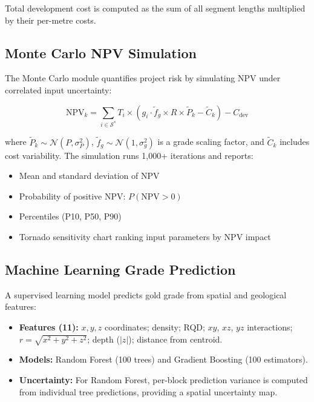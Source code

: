 \documentclass[12pt,a4paper]{article}
\begin{document}
Total development cost is computed as the sum of all segment lengths multiplied by their per-metre costs.

\subsection{Monte Carlo NPV Simulation}
\label{sec:monte-carlo}

The Monte Carlo module quantifies project risk by simulating NPV under correlated input uncertainty:

\begin{equation}
    \text{NPV}_k = \sum_{i \in \mathcal{S}^*} T_i \times \left( g_i \cdot \tilde{f}_g \times R \times \tilde{P}_k - \tilde{C}_k \right) - C_{\text{dev}}
\end{equation}

where $\tilde{P}_k \sim \mathcal{N}(P, \sigma_P^2)$, $\tilde{f}_g \sim \mathcal{N}(1, \sigma_g^2)$ is a grade scaling factor, and $\tilde{C}_k$ includes cost variability. The simulation runs 1{,}000+ iterations and reports:

\begin{itemize}[itemsep=0.1em]
    \item Mean and standard deviation of NPV
    \item Probability of positive NPV: $P(\text{NPV} > 0)$
    \item Percentiles (P10, P50, P90)
    \item Tornado sensitivity chart ranking input parameters by NPV impact
\end{itemize}

\subsection{Machine Learning Grade Prediction}
\label{sec:ml}

A supervised learning model predicts gold grade from spatial and geological features:

\begin{itemize}[itemsep=0.1em]
    \item \textbf{Features (11):} $x, y, z$ coordinates; density; RQD; $xy$, $xz$, $yz$ interactions; $r = \sqrt{x^2+y^2+z^2}$; depth ($|z|$); distance from centroid.
    \item \textbf{Models:} Random Forest (100 trees) and Gradient Boosting (100 estimators).
    \item \textbf{Uncertainty:} For Random Forest, per-block prediction variance is computed from individual tree predictions, providing a spatial uncertainty map.
\end{itemize}
\end{document}
